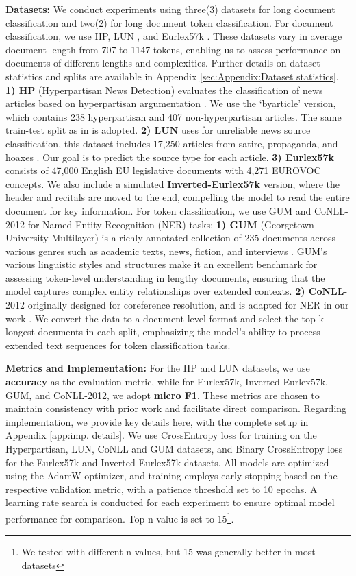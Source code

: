 \documentclass[11pt]{article}
\begin{document}
\textbf{Datasets: } We conduct experiments using three(3) datasets for long document classification and two(2) for long document token classification. For document classification, we use HP\citep{kiesel2019semeval}, LUN \citep{rashkin2017truth}, and Eurlex57k \citep{chalkidis2019large}. These datasets vary in average document length from 707 to 1147 tokens, enabling us to assess performance on documents of different lengths and complexities. Further details on dataset statistics and splits are available in Appendix \ref{sec:Appendix:Dataset statistics}. 
\textbf{1) HP} (Hyperpartisan News Detection) evaluates the classification of news articles based on hyperpartisan argumentation \citep{kiesel2019semeval}. We use the ‘byarticle’ version, which contains 238 hyperpartisan and 407 non-hyperpartisan articles. The same train-test split as in \citep{beltagy2020longformer} is adopted.
\textbf{2) LUN} uses for unreliable news source classification, this dataset includes 17,250 articles from satire, propaganda, and hoaxes \citep{rashkin2017truth}. Our goal is to predict the source type for each article.
\textbf{3) Eurlex57k} consists of 47,000 English EU legislative documents with 4,271 EUROVOC concepts. We also include a simulated \textbf{Inverted-Eurlex57k} version, where the header and recitals are moved to the end, compelling the model to read the entire document for key information.
For token classification, we use GUM and CoNLL-2012 for Named Entity Recognition (NER) tasks:
\textbf{1) GUM} (Georgetown University Multilayer) is a richly annotated collection of 235 documents across various genres such as academic texts, news, fiction, and interviews \citep{lin-zeldes-2021-wikigum}. GUM’s various linguistic styles and structures make it an excellent benchmark for assessing token-level understanding in lengthy documents, ensuring that the model captures complex entity relationships over extended contexts.
\textbf{2) CoNLL}-2012 originally designed for coreference resolution, and is adapted for NER in our work \citep{pradhan-etal-2013-towards}. We convert the data to a document-level format and select the top-k longest documents in each split, emphasizing the model’s ability to process extended text sequences for token classification tasks.

\textbf{Metrics and Implementation: } For the HP and LUN datasets, we use \textbf{accuracy} as the evaluation metric, while for Eurlex57k, Inverted Eurlex57k, GUM, and CoNLL-2012, we adopt \textbf{micro F1}. These metrics are chosen to maintain consistency with prior work and facilitate direct comparison.
Regarding implementation, we provide key details here, with the complete setup in Appendix \ref{app:imp. details}. We use CrossEntropy loss for training on the Hyperpartisan, LUN, CoNLL and GUM datasets, and Binary CrossEntropy loss for the Eurlex57k and Inverted Eurlex57k datasets. All models are optimized using the AdamW optimizer, and training employs early stopping based on the respective validation metric, with a patience threshold set to 10 epochs. A learning rate search is conducted for each experiment to ensure optimal model performance for comparison. Top-n value is set to 15\footnote{We tested with different n values, but 15 was generally better in most datasets}.
\end{document}
